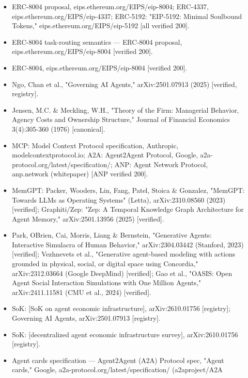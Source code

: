 \documentclass[
]{article}
\begin{document}
\begin{itemize}
  the EIP) {[}verified 200{]}.
\item
  ERC-8004 proposal, eips.ethereum.org/EIPS/eip-8004; ERC-4337,
  eips.ethereum.org/EIPS/eip-4337; ERC-5192: "EIP-5192: Minimal
  Soulbound Tokens," eips.ethereum.org/EIPS/eip-5192 {[}all verified
  200{]}.
\item
  ERC-8004 task-routing semantics --- ERC-8004 proposal,
  eips.ethereum.org/EIPS/eip-8004 {[}verified 200{]}.
\item
  ERC-8004, eips.ethereum.org/EIPS/eip-8004 {[}verified 200{]}.
\item
  Ngo, Chan et al., "Governing AI Agents," arXiv:2501.07913 (2025)
  {[}verified, registry{]}.
\item
  Jensen, M.C. \& Meckling, W.H., "Theory of the Firm: Managerial
  Behavior, Agency Costs and Ownership Structure," Journal of Financial
  Economics 3(4):305-360 (1976) {[}canonical{]}.
\item
  MCP: Model Context Protocol specification, Anthropic,
  modelcontextprotocol.io; A2A: Agent2Agent Protocol, Google,
  a2a-protocol.org/latest/specification/; ANP: Agent Network Protocol,
  anp.network (whitepaper) {[}ANP verified 200{]}.
\item
  MemGPT: Packer, Wooders, Lin, Fang, Patel, Stoica \& Gonzalez,
  "MemGPT: Towards LLMs as Operating Systems" (Letta), arXiv:2310.08560
  (2023) {[}verified{]}; Graphiti/Zep: "Zep: A Temporal Knowledge Graph
  Architecture for Agent Memory," arXiv:2501.13956 (2025)
  {[}verified{]}.
\item
  Park, O\textquotesingle Brien, Cai, Morris, Liang \& Bernstein,
  "Generative Agents: Interactive Simulacra of Human Behavior,"
  arXiv:2304.03442 (Stanford, 2023) {[}verified{]}; Vezhnevets et al.,
  "Generative agent-based modeling with actions grounded in physical,
  social, or digital space using Concordia," arXiv:2312.03664 (Google
  DeepMind) {[}verified{]}; Gao et al., "OASIS: Open Agent Social
  Interaction Simulations with One Million Agents," arXiv:2411.11581
  (CMU et al., 2024) {[}verified{]}.
\item
  SoK: {[}SoK on agent economic infrastructure{]}, arXiv:2610.01756
  {[}registry{]}; Governing AI Agents, arXiv:2501.07913 {[}registry{]}.
\item
  SoK: {[}decentralized agent economic infrastructure survey{]},
  arXiv:2610.01756 {[}registry{]}.
\item
  Agent cards specification --- Agent2Agent (A2A) Protocol spec, "Agent
  cards," Google, a2a-protocol.org/latest/specification/ (a2aproject/A2A

\end{itemize}
\end{document}
